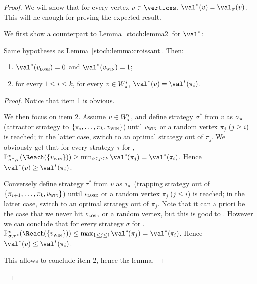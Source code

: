\begin{proof}
  We will show that for every vertex $v \in \vertices$, $\val^*(v) =
  \val_\perm(v)$. This will ne enough for proving the expected result.

  We first show a counterpart to Lemma~\ref{stoch:lemma2} for
  $\val^*$:
  \begin{lemma}
    Same hypotheses as Lemma~\ref{stoch:lemma:croissant}. Then:
    \begin{enumerate}
    \item $\val^*(\vlose) = 0$ and $\val^*(\vwin) = 1$;
    \item for every $1 \le i \le k$, for every $v \in W_\pi^i$,
      $\val^*(v) = \val^*(\perm_i)$.
    \end{enumerate}
  \end{lemma}

  \begin{proof}
    Notice that item 1 is obvious. 

    We then focus on item 2.  Assume $v \in W_\pi^i$, and define
    strategy $\sigma^*$ from $v$ as $\sigma_\pi$ (attractor strategy
    to $\{\pi_i,\ldots,\pi_k,v_{\textsc{win}}\}$) until $v_{\textsc{win}}$ or a random
    vertex $\pi_j$ ($j \ge i$) is reached; in the latter case, switch
    to an optimal strategy out of $\pi_j$. We obviously get that for
    every strategy $\tau$ for \Adam,
    $\probm_{\sigma^*,\tau}^v(\Reach(\{\vwin\})) \ge \min_{i \le j \le
      k}\val^*(\perm_j) = \val^*(\perm_i)$. Hence $\val^*(v) \ge
    \val^*(\perm_i)$.
    
    Conversely define strategy $\tau^*$ from $v$ as $\tau_\pi$
    (trapping strategy out of $\{\pi_{i+1},\ldots,\pi_k,v_{\textsc{win}}\}$)
    until $v_{\textsc{lose}}$ or a random vertex $\pi_j$ ($j \le i$) is reached;
    in the latter case, switch to an optimal strategy out of
    $\pi_j$. Note that it can a priori be the case that we never hit
    $v_{\textsc{lose}}$ or a random vertex, but this is good to \Adam. However we
    can conclude that for every strategy $\sigma$ for \Eve,
    $\probm_{\sigma,\tau^*}^v(\Reach(\{\vwin\})) \le \max_{1 \le j \le
      i}\val^*(\perm_j) = \val^*(\perm_i)$. Hence
    $\val^*(v) \le \val^*(\perm_i)$.

    This allows to conclude item 2, hence the lemma.
  \end{proof}


\end{proof}
